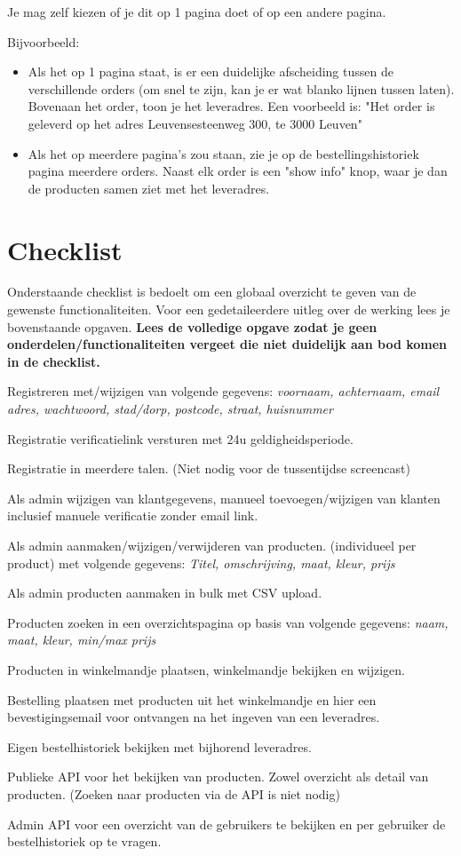 \documentclass{article}
\begin{document}
Je mag zelf kiezen of je dit op 1 pagina doet of op een andere pagina. 

Bijvoorbeeld:
\begin{itemize}
    \item Als het op 1 pagina staat, is er een duidelijke afscheiding tussen de verschillende orders (om snel te zijn, kan je er wat blanko lijnen tussen laten). Bovenaan het order, toon je het leveradres. Een voorbeeld is: "Het order is geleverd op het adres Leuvensesteenweg 300, te 3000 Leuven"
    \item Als het op meerdere pagina's zou staan, zie je op de bestellingshistoriek pagina meerdere orders. Naast elk order is een "show info" knop, waar je dan de producten samen ziet met het leveradres.
\end{itemize}

\section{Checklist}
Onderstaande checklist is bedoelt om een globaal overzicht te geven van de gewenste functionaliteiten. Voor een gedetaileerdere uitleg over de werking lees je bovenstaande opgaven. \textbf{Lees de volledige opgave zodat je geen onderdelen/functionaliteiten vergeet die niet duidelijk aan bod komen in de checklist.}

\begin{todolist}
    \item Registreren met/wijzigen van volgende gegevens: \textit{voornaam, achternaam, email adres, wachtwoord, stad/dorp, postcode, straat, huisnummer}
    \item Registratie verificatielink versturen met 24u geldigheidsperiode.
    \item Registratie in meerdere talen. (Niet nodig voor de tussentijdse screencast)
    \item Als admin wijzigen van klantgegevens, manueel toevoegen/wijzigen van klanten inclusief manuele verificatie zonder email link.
    \item Als admin aanmaken/wijzigen/verwijderen van producten. (individueel per product) met volgende gegevens: \textit{Titel, omschrijving, maat, kleur, prijs}
    \item Als admin producten aanmaken in bulk met CSV upload.
    \item Producten zoeken in een overzichtspagina op basis van volgende gegevens: \textit{naam, maat, kleur, min/max prijs}
    \item Producten in winkelmandje plaatsen, winkelmandje bekijken en wijzigen.
    \item Bestelling plaatsen met producten uit het winkelmandje en hier een bevestigingsemail voor ontvangen na het ingeven van een leveradres.
    \item Eigen bestelhistoriek bekijken met bijhorend leveradres.
    \item Publieke API voor het bekijken van producten. Zowel overzicht als detail van producten. (Zoeken naar producten via de API is niet nodig)
    \item Admin API voor een overzicht van de gebruikers te bekijken en per gebruiker de bestelhistoriek op te vragen.
\end{todolist}
\end{document}
